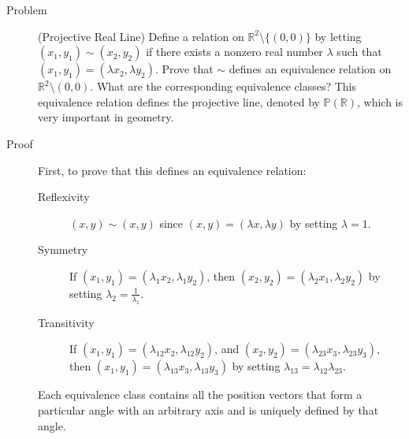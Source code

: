 \begin{description}
\item[Problem] (Projective Real Line) Define a relation on $\mathbb{R}^2
\setminus \{(0, 0)\}$ by letting $(x_1, y_1) \sim (x_2, y_2)$ if there exists
a nonzero real number $\lambda$ such that $(x_1, y_1) = (\lambda x_2, \lambda
y_2)$. Prove that $\sim$ defines an equivalence relation on $\mathbb{R}^2
\setminus (0, 0)$. What are the corresponding equivalence classes? This
equivalence relation defines the projective line, denoted by
$\mathbb{P}(\mathbb{R})$, which is very important in geometry.

\item[Proof] First, to prove that this defines an equivalence relation:
\begin{description}
\item[Reflexivity] $(x, y) \sim (x, y)$ since $(x, y) = (\lambda x, \lambda
y)$ by setting $\lambda = 1$.
\item[Symmetry] If $(x_1, y_1) = (\lambda_1 x_2, \lambda_1 y_2)$, then $(x_2,
y_2) = (\lambda_2 x_1, \lambda_2 y_2)$ by setting $\lambda_2 =
\frac{1}{\lambda_1}$.
\item[Transitivity] If $(x_1, y_1) = (\lambda_{12} x_2, \lambda_{12} y_2)$,
and $(x_2, y_2) = (\lambda_{23} x_3, \lambda_{23} y_3)$, then $(x_1, y_1) =
(\lambda_{13} x_3, \lambda_{13} y_3)$ by setting $\lambda_{13} = \lambda_{12}
\lambda_{23}$.
\end{description}

Each equivalence class contains all the position vectors that form a particular
angle with an arbitrary axis and is uniquely defined by that angle.

\end{description}
